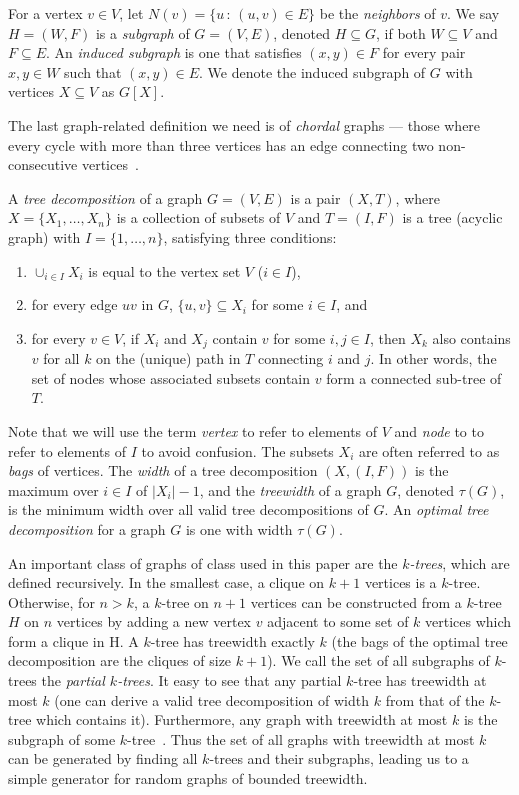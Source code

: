 \documentclass[conference]{IEEEtran}
\begin{document}
For a vertex $v \in V$, let $N(v) = \{u\,:\,(u,v) \in E\}$ be the
{\em neighbors} of $v$. We say $H = (W,F)$ is a {\em subgraph} of $G = (V,E)$, denoted
$H \subseteq G$,  if both $W \subseteq V$ and $F \subseteq E$.
An  {\em induced subgraph} is one that satisfies $(x,y) \in F$ for every pair $x,y \in W$ such that $(x,y)\in E$. We denote the induced subgraph of $G$ with
vertices $X \subseteq V$ as $G[X]$.

The last graph-related definition we need is of {\em chordal} graphs ---
those where every cycle with more than three vertices has an edge connecting two non-consecutive
vertices~\cite{Gavril1974intersection}.

A {\em tree decomposition} of a
graph $G = (V,E)$ is a pair $(X,T)$, where $X = \{X_1, \ldots, X_n\}$
is a collection of subsets of $V$ and $T = (I,F)$ is a tree (acyclic graph) with $I =
\{1,\ldots,n\}$, satisfying three conditions:
\begin{enumerate}
\item $\cup_{i\in I} X_i$ is equal to the vertex set $V$
  ($i \in I$),
\item for every edge $uv$ in $G$, $\{u,v\} \subseteq X_i$ for some $i
  \in I$, and
\item for every $v \in V$, if $X_i$ and $X_j$ contain $v$ for some
  $i,j \in I$, then $X_k$ also contains $v$ for all $k$ on the
  (unique) path in $T$ connecting $i$ and $j$. In other words, the set
  of nodes whose associated subsets contain $v$ form a connected sub-tree of
  $T$.
\end{enumerate}

Note that we will use the term {\em vertex} to refer to elements of $V$ and {\em node}
to to refer to elements of $I$ to avoid confusion. The subsets $X_i$ are often referred
to as \emph{bags} of vertices. The {\em width} of a tree decomposition
$(X, (I,F))$ is the maximum over $i \in I$ of
$|X_i|-1$, and the {\em treewidth} of a graph $G$, denoted $\tau(G)$,
is the minimum width over all valid tree decompositions of $G$. An {\em optimal tree
  decomposition} for a graph $G$ is one with width $\tau(G)$.

An important class of graphs of class used in this paper are the {\em
  $k$-trees}, which are defined recursively. In the smallest
case, a clique on $k+1$ vertices is a $k$-tree. Otherwise,  for $n >
k$, a $k$-tree on $n+1$ vertices can be constructed from a
$k$-tree $H$ on $n$ vertices by adding a new vertex $v$ adjacent to
some set of $k$ vertices which form a clique in H. A $k$-tree has
treewidth exactly $k$ (the bags of the optimal tree decomposition are
the cliques of size $k+1$). We call the set of all subgraphs of
$k$-trees the {\em partial $k$-trees}.  It easy to see that any
partial $k$-tree has treewidth at most $k$ (one can derive a valid
tree decomposition of width $k$ from that of the $k$-tree which
contains it). Furthermore, any graph with treewidth at most $k$ is
the subgraph of some $k$-tree~\cite{Leeuwen1990}. Thus the set of all graphs with
treewidth at most $k$ can be generated by finding all $k$-trees and
their subgraphs, leading us to a simple generator for random graphs
of bounded treewidth.
\end{document}
